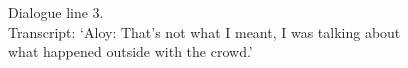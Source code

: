 \begin{figure}[h]
	\centerline{}
	\centerline{}
	\caption{Dialogue line 3. \\ Transcript: `Aloy: That's not what I meant, I was talking about what happened outside with the crowd.'}
\end{figure}

